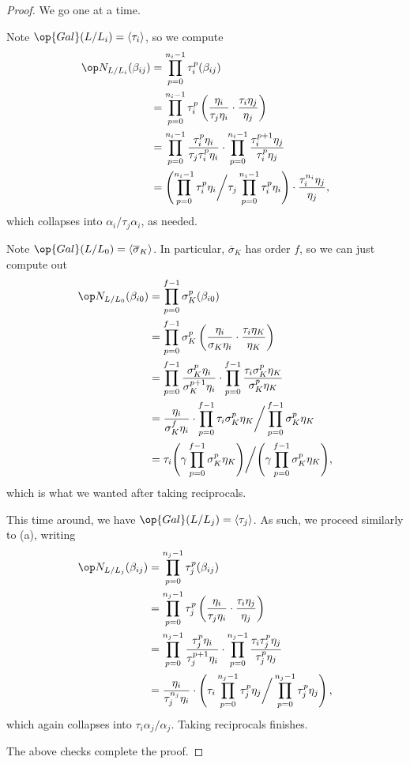 \begin{proof}
	We go one at a time.
	\begin{listalph}
		\item Note $\op{Gal}(L/L_i)=\langle\tau_i\rangle$, so we compute
		\begin{align*}
			\op N_{L/L_i}(\beta_{ij}) &= \prod_{p=0}^{n_i-1}
			\tau_i^p(\beta_{ij}) \\
			&= \prod_{p=0}^{n_i-1}
			\tau_i^p\left(\frac{\eta_{i}}{\tau_j\eta_i}\cdot\frac{\tau_i\eta_j}{\eta_{j}}\right) \\
			&= \prod_{p=0}^{n_i-1}
			\frac{\tau_i^p\eta_{i}}{\tau_j\tau_i^p\eta_i}\cdot\prod_{p=0}^{n_i-1}\frac{\tau_i^{p+1}\eta_j}{\tau_i^p\eta_{j}} \\
			&= \left(\prod_{p=0}^{n_i-1}\tau_i^p\eta_{i}\bigg/\tau_j\prod_{p=0}^{n_i-1}\tau_i^p\eta_i\right)\cdot\frac{\tau_i^{n_i}\eta_j}{\eta_{j}},
		\end{align*}
		which collapses into $\alpha_i/\tau_j\alpha_i$, as needed.
		\item Note $\op{Gal}(L/L_0)=\langle\overline\sigma_K\rangle$. In particular, $\overline\sigma_K$ has order $f$, so we can just compute out
		\begin{align*}
			\op N_{L/L_0}(\beta_{i0}) &= \prod_{p=0}^{f-1}\sigma_K^p(\beta_{i0}) \\
			&= \prod_{p=0}^{f-1}\sigma_K^p\left(\frac{\eta_i}{\sigma_K\eta_i}\cdot\frac{\tau_i\eta_K}{\eta_K}\right) \\
			&= \prod_{p=0}^{f-1}\frac{\sigma_K^p\eta_i}{\sigma_K^{p+1}\eta_i}\cdot\prod_{p=0}^{f-1}\frac{\tau_i\sigma_K^p\eta_K}{\sigma_K^p\eta_K} \\
			&= \frac{\eta_i}{\sigma_K^f\eta_i}\cdot\prod_{p=0}^{f-1}\tau_i\sigma_K^p\eta_K\bigg/\prod_{p=0}^{f-1}\sigma_K^p\eta_K \\
			&= \tau_i\Bigg(\gamma\prod_{p=0}^{f-1}\sigma_K^p\eta_K\Bigg)\bigg/\Bigg(\gamma\prod_{p=0}^{f-1}\sigma_K^p\eta_K\Bigg),
		\end{align*}
		which is what we wanted after taking reciprocals.
		\item This time around, we have $\op{Gal}(L/L_j)=\langle\tau_j\rangle$. As such, we proceed similarly to (a), writing
		\begin{align*}
			\op N_{L/L_j}(\beta_{ij}) &= \prod_{p=0}^{n_j-1}
			\tau_j^p(\beta_{ij}) \\
			&= \prod_{p=0}^{n_j-1}
			\tau_j^p\left(\frac{\eta_{i}}{\tau_j\eta_i}\cdot\frac{\tau_i\eta_j}{\eta_{j}}\right) \\
			&= \prod_{p=0}^{n_j-1}
			\frac{\tau_j^p\eta_{i}}{\tau_j^{p+1}\eta_i}\cdot\prod_{p=0}^{n_j-1}\frac{\tau_i\tau_j^p\eta_j}{\tau_j^p\eta_{j}} \\
			&= \frac{\eta_i}{\tau_j^{n_j}\eta_i}\cdot\left(\tau_i\prod_{p=0}^{n_j-1}\tau_j^p\eta_j\bigg/\prod_{p=0}^{n_j-1}\tau_j^p\eta_j\right),
		\end{align*}
		which again collapses into $\tau_i\alpha_j/\alpha_j$. Taking reciprocals finishes.
	\end{listalph}
	The above checks complete the proof.
\end{proof}
